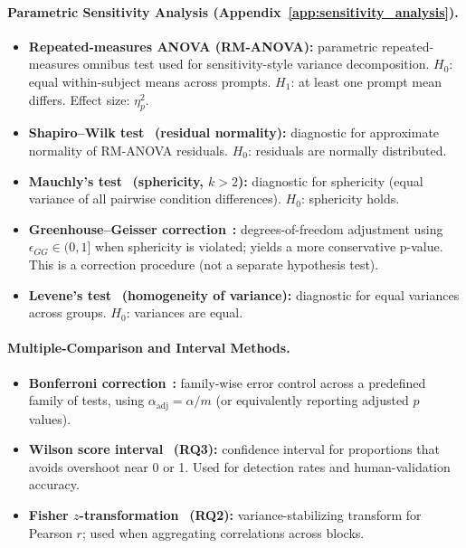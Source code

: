 \paragraph{Parametric Sensitivity Analysis (Appendix~\ref{app:sensitivity_analysis}).}
\begin{itemize}[noitemsep]
    \item \textbf{Repeated-measures ANOVA (RM-ANOVA):} parametric repeated-measures omnibus test used for sensitivity-style variance decomposition. $H_0$: equal within-subject means across prompts. $H_1$: at least one prompt mean differs. Effect size: $\eta^2_p$.
    \item \textbf{Shapiro--Wilk test}~\cite{shapiro1965analysis} \textbf{(residual normality):} diagnostic for approximate normality of RM-ANOVA residuals. $H_0$: residuals are normally distributed.
    \item \textbf{Mauchly's test}~\cite{mauchly1940significance} \textbf{(sphericity, $k>2$):} diagnostic for sphericity (equal variance of all pairwise condition differences). $H_0$: sphericity holds.
    \item \textbf{Greenhouse--Geisser correction}~\cite{greenhouse1959methods}\textbf{:} degrees-of-freedom adjustment using $\epsilon_{GG}\in(0,1]$ when sphericity is violated; yields a more conservative p-value. This is a correction procedure (not a separate hypothesis test).
    \item \textbf{Levene's test}~\cite{levene1960robust} \textbf{(homogeneity of variance):} diagnostic for equal variances across groups. $H_0$: variances are equal.
\end{itemize}

\paragraph{Multiple-Comparison and Interval Methods.}
\begin{itemize}[noitemsep]
    \item \textbf{Bonferroni correction}~\cite{bonferroni1936teoria,dunn1961multiple}\textbf{:} family-wise error control across a predefined family of tests, using $\alpha_{\text{adj}}=\alpha/m$ (or equivalently reporting adjusted $p$ values).
    \item \textbf{Wilson score interval}~\cite{wilson1927probable} \textbf{(RQ3):} confidence interval for proportions that avoids overshoot near 0 or 1. Used for detection rates and human-validation accuracy.
    \item \textbf{Fisher $z$-transformation}~\cite{fisher1915frequency} \textbf{(RQ2):} variance-stabilizing transform for Pearson $r$; used when aggregating correlations across blocks.
\end{itemize}

